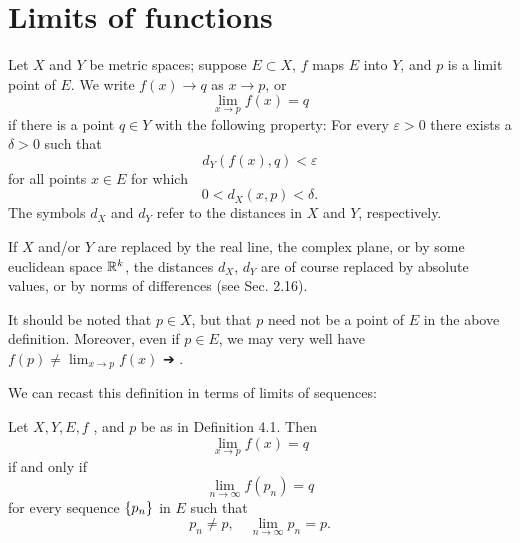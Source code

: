 \section{Limits of functions}

\begin{myDef}
    \label{myDef:4.1}
    Let $X$ and $Y$ be metric spaces; suppose $E \subset X$, $f$ maps $E$ into $Y$, and $p$ is a limit point of $E$. We write $f(x) \rightarrow q$ as $x \rightarrow p$, or
    \begin{equation}
        \label{eq:4.1}
        \lim_{x \to p} f(x) = q
    \end{equation}
    if there is a point $q \in Y$ with the following property: For every $\varepsilon > 0$ there exists a $\delta > 0$ such that
    \begin{equation}
        \label{eq:4.2}
        d_Y (f(x), q) < \varepsilon
    \end{equation}
    for all points $x \in E$ for which
    \begin{equation}
        \label{eq:4.3}
        0 < d_X (x, p) < \delta.
    \end{equation}
    The symbols $d_X$ and $d_Y$ refer to the distances in $X$ and $Y$,  respectively.
\end{myDef}
If $X$ and/or $Y$ are replaced by the real line, the complex plane, or by some euclidean space ${\protect\mathbb R}^{k}$, the distances $d_X$, $d_Y$ are of course replaced by absolute values, or by norms of differences (see Sec. 2.16).

It should be noted that $p \in X$, but that $p$ need not be a point of $E$ in the above definition. Moreover, even if $p \in E$, we may very well have $f(p) \neq \lim_{x \to p} f(x)$ ➔ .

We can recast this definition in terms of limits of sequences:

\begin{thm}
    \label{thm:4.2}
    Let $X,Y,E,f$ , and $p$ be as in Definition 4.1. Then
    \begin{equation}
        \label{eq:4.4}
        \lim_{x \to p} f(x) = q
    \end{equation}
    if and only if 
    \begin{equation}
        \label{eq:4.5}
        \lim_{n \to \infty} f(p_n) = q
    \end{equation}
    for every sequence $\protect\{p_n\}$ in $E$ such that
    \begin{equation}
        \label{eq:4.6}
        p_n \neq p, \quad
        \lim_{n \to \infty} p_n = p.
    \end{equation}
\end{thm}

